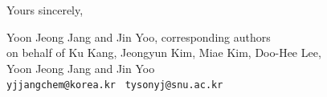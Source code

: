 \documentclass[11pt,a4paper]{article}
\begin{document}
\begin{minipage}{\linewidth}
Yours sincerely,

\vspace{5pt}

\noindent Yoon Jeong Jang and Jin Yoo, corresponding authors\\
on behalf of Ku Kang, Jeongyun Kim, Miae Kim, Doo-Hee Lee,\\
Yoon Jeong Jang and Jin Yoo\\
\texttt{yjjangchem@korea.kr} \textperiodcentered\ \texttt{tysonyj@snu.ac.kr}
\end{minipage}

\end{document}
